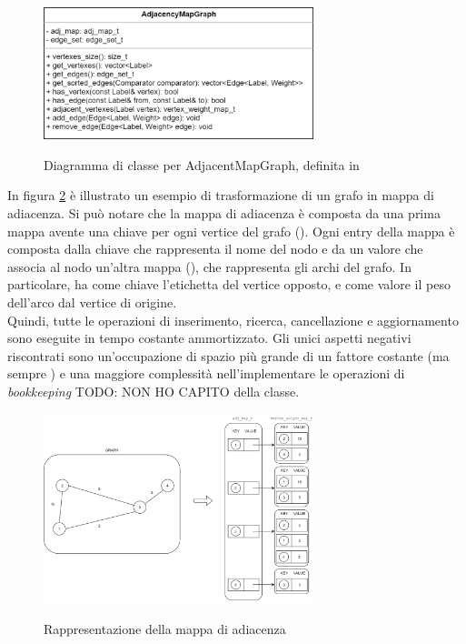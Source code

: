 \begin{figure}[h]
	\caption{Diagramma di classe per AdjacentMapGraph, definita in }
	\centering
	\includegraphics[width=0.7\textwidth]{./images/AdjancencyMapGrapClass.png}
	\label{fig:AdjMapGraph Class}
\end{figure}

\noindent In figura \ref{fig:AdjMapGraph Abstract} è illustrato un esempio di trasformazione di un grafo in mappa di adiacenza. Si può notare che la mappa di adiacenza è composta da una prima mappa avente una chiave per ogni vertice del grafo (). Ogni entry della mappa è composta dalla chiave che rappresenta il nome del nodo e da un valore che associa al nodo un'altra mappa (), che rappresenta gli archi del grafo.
In particolare,  ha come chiave l'etichetta del vertice opposto, e come valore il peso dell'arco dal vertice di origine. \\

\noindent Quindi, tutte le operazioni di inserimento, ricerca, cancellazione e aggiornamento sono eseguite in tempo costante ammortizzato. Gli unici aspetti negativi riscontrati sono un'occupazione di spazio più grande di un fattore costante (ma sempre \complexityNPlusM{}) e una maggiore complessità nell'implementare le operazioni di \textit{bookkeeping} TODO: NON HO CAPITO della classe. \\

\begin{figure}[h]
	\caption{Rappresentazione della mappa di adiacenza}
	\centering
	\includegraphics[width=0.7\textwidth]{./images/AdjMapGraphAbstract.png}
	\label{fig:AdjMapGraph Abstract}
\end{figure}

